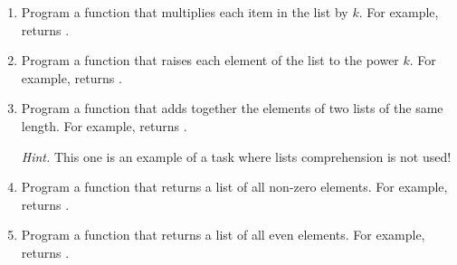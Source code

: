 \documentclass[11pt,class=report,crop=false]{standalone}
\begin{document}
\begin{activite}


\begin{enumerate}
  \item Program a function  that multiplies each item in the list by $k$. For example,  returns \ci{[2,4,6,8,10]}.
  
  \item Program a function  that raises each element of the list to the power $k$. For example,  returns \ci{[1,8,27,64,125]}.
  
  \item Program a function  that adds together the elements of two lists of the same length. For example,  returns \ci{[5,7,9]}.
  
  \emph{Hint.} This one is an example of a task where lists comprehension is not used!
  

  \item Program a function  that returns a list of all non-zero elements. For example,  returns \ci{[1,2,3,4,5]}.
  
  \item Program a function  that returns a list of all even elements. For example,  returns \ci{[0,2,0,4,0]}.
  
\end{enumerate}

\end{activite}



\end{document}
